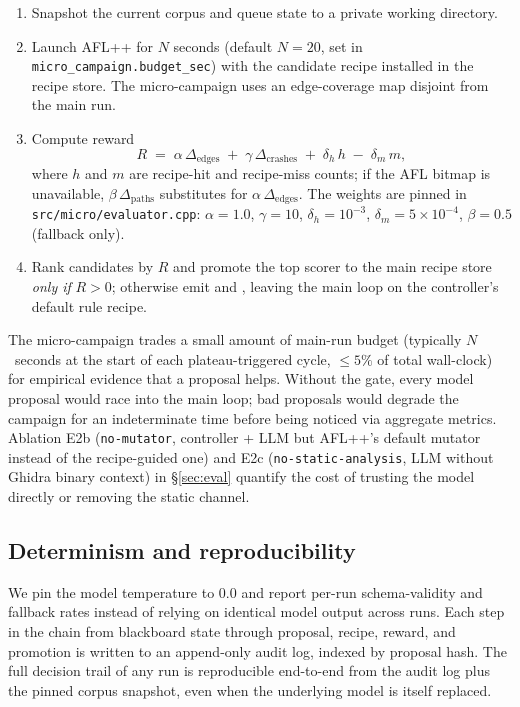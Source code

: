 \documentclass[11pt]{article}
\begin{document}
\begin{enumerate}
  \item Snapshot the current corpus and queue state to a private
  working directory.
  \item Launch AFL++ for $N$ seconds (default $N=20$, set in
  \texttt{micro\_campaign.budget\_sec}) with the candidate recipe
  installed in the recipe store. The micro-campaign uses an
  edge-coverage map disjoint from the main run.
  \item Compute reward
  \begin{equation*}
    R \;=\; \alpha\,\Delta_{\text{edges}} \;+\;
            \gamma\,\Delta_{\text{crashes}} \;+\;
            \delta_h\,h \;-\; \delta_m\,m,
  \end{equation*}
  where $h$ and $m$ are recipe-hit and recipe-miss counts; if the
  AFL bitmap is unavailable, $\beta\,\Delta_{\text{paths}}$
  substitutes for $\alpha\,\Delta_{\text{edges}}$. The weights are
  pinned in \texttt{src/micro/evaluator.cpp}: $\alpha{=}1.0$,
  $\gamma{=}10$, $\delta_h{=}10^{-3}$, $\delta_m{=}5{\times}10^{-4}$,
  $\beta{=}0.5$ (fallback only).
  \item Rank candidates by $R$ and promote the top scorer to the
  main recipe store \emph{only if} $R>0$; otherwise emit
   and
  ,
  leaving the main loop on the controller's default rule recipe.
\end{enumerate}

The micro-campaign trades a small amount of main-run budget
(typically $N$~seconds at the start of each plateau-triggered cycle,
$\leq 5\%$ of total wall-clock) for empirical evidence that a
proposal helps. Without the gate, every model proposal would race
into the main loop; bad proposals would degrade the campaign for an
indeterminate time before being noticed via aggregate metrics.
Ablation E2b (\texttt{no-mutator}, controller + LLM but AFL++'s default
mutator instead of the recipe-guided one) and E2c (\texttt{no-static-analysis},
LLM without Ghidra binary context) in \S\ref{sec:eval} quantify the
cost of trusting the model directly or removing the static channel.

\subsection{Determinism and reproducibility}
\label{sec:plateau:repro}

We pin the model temperature to $0.0$ and report per-run
schema-validity and fallback rates instead of relying on identical
model output across runs. Each step in the chain from blackboard
state through proposal, recipe, reward, and promotion is written to
an append-only audit log, indexed by
proposal hash. The full decision trail of any run is reproducible
end-to-end from the audit log plus the pinned corpus snapshot, even
when the underlying model is itself replaced.
\end{document}
